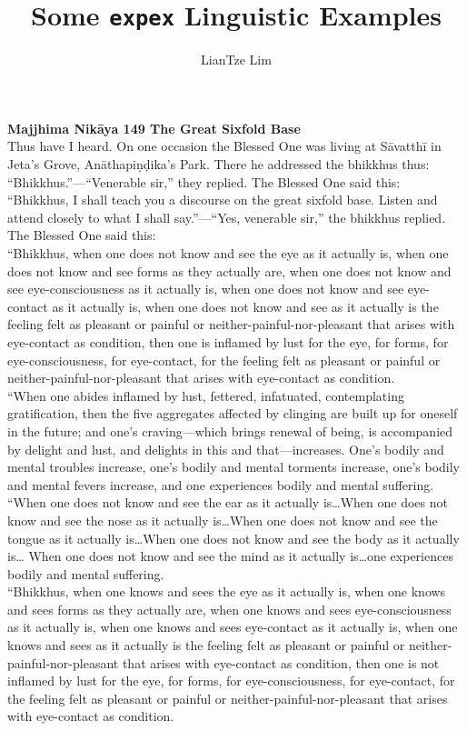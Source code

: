 \documentclass[11pt]{article}
\title{Some \texttt{expex} Linguistic Examples}
\author{LianTze Lim}
\begin{document}
\textbf{Majjhima Nikāya 149
The Great Sixfold Base}\\[.3cm]

Thus have I heard. On one occasion the Blessed One was living at Sāvatthī in Jeta’s Grove, Anāthapiṇḍika’s Park. There he addressed the bhikkhus thus: “Bhikkhus.”—“Venerable sir,” they replied. The Blessed One said this:\\

“Bhikkhus, I shall teach you a discourse on the great sixfold base. Listen and attend closely to what I shall say.”—“Yes, venerable sir,” the bhikkhus replied. The Blessed One said this:\\

“Bhikkhus, when one does not know and see the eye as it actually is, when one does not know and see forms as they actually are, when one does not know and see eye-consciousness as it actually is, when one does not know and see eye-contact as it actually is, when one does not know and see as it actually is the feeling felt as pleasant or painful or neither-painful-nor-pleasant that arises with eye-contact as condition, then one is inflamed by lust for the eye, for forms, for eye-consciousness, for eye-contact, for the feeling felt as pleasant or painful or neither-painful-nor-pleasant that arises with eye-contact as condition.\\

“When one abides inflamed by lust, fettered, infatuated, contemplating gratification, then the five aggregates affected by clinging are built up for oneself in the future; and one’s craving—which brings renewal of being, is accompanied by delight and lust, and delights in this and that—increases. One’s bodily and mental troubles increase, one’s bodily and mental torments increase, one’s bodily and mental fevers increase, and one experiences bodily and mental suffering.\\

“When one does not know and see the ear as it actually is…When one does not know and see the nose as it actually is…When one does not know and see the tongue as it actually is…When one does not know and see the body as it actually is… When one does not know and see the mind as it actually is…one experiences bodily and mental suffering.\\

“Bhikkhus, when one knows and sees the eye as it actually is, when one knows and sees forms as they actually are, when one knows and sees eye-consciousness as it actually is, when one knows and sees eye-contact as it actually is, when one knows and sees as it actually is the feeling felt as pleasant or painful or neither-painful-nor-pleasant that arises with eye-contact as condition, then one is not inflamed by lust for the eye, for forms, for eye-consciousness, for eye-contact, for the feeling felt as pleasant or painful or neither-painful-nor-pleasant that arises with eye-contact as condition.\\
\end{document}
